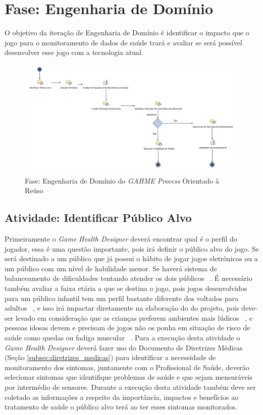 \section{Fase: Engenharia de Domínio}
O objetivo da iteração de Engenharia de Domínio é identificar o impacto que o jogo para o monitoramento de dados de saúde trará e avaliar se será possível desenvolver esse jogo com a tecnologia atual.

\begin{figure}
 \centering
 \includegraphics[scale=0.55]{./img/engenhariadominio.png}
\caption{Fase: Engenharia de Domínio do \textit{GAHME Process} Orientado à Reúso}
 \label{fig:iniciacao}
\end{figure}

\subsection{Atividade: Identificar Público Alvo}
Primeiramente o \textit{Game Health Designer} deverá encontrar qual é o perfil do jogador, essa é uma questão importante, pois irá definir o público alvo do jogo. Se será destinado a um público que já possui o hábito de jogar jogos eletrônicos ou a um público com um nível de habilidade menor. Se haverá sistema de balanceamento de dificuldades tentando atender os dois públicos ~\cite{brathwaite2009challenges}. É necessário também avaliar a faixa etária a que se destina o jogo, pois jogos desenvolvidos para um público infantil tem um perfil bastante diferente dos voltados para adultos ~\cite{brathwaite2009challenges}, e isso irá impactar diretamente na elaboração do  do projeto, pois deve-ser levado em consideração que as crianças preferem ambientes mais lúdicos ~\cite{yannakakis06}, e pessoas idosas devem e precisam de jogos não os ponha em situação de risco de saúde como quedas ou fadiga muscular ~\cite{brox11,arntzen2011}.
Para a execução desta atividade o \textit{Game Health Designer} deverá fazer uso do Documento de Diretrizes Médicas (Seção \ref{subsec:diretrizes_medicas}) para identificar a necessidade de monitoramento dos sintomas, juntamente com o Profissional de Saúde, deverão selecionar sintomas que identifique problemas de saúde e que sejam mensuráveis por intermédio de sensores. Durante a execução desta atividade também deve ser coletado as informações a respeito da importância, impactos e benefícios ao tratamento de saúde o público alvo terá ao ter esses sintomas monitorados.

